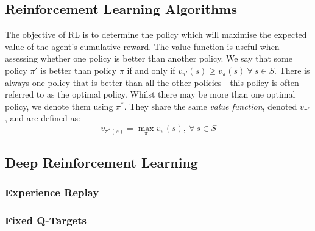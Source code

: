 \documentclass[a4paper]{article}
\begin{document}
\subsection{Reinforcement Learning Algorithms}
The objective of RL is to determine the policy which will maximise the expected value of the agent's cumulative reward. The value function is useful when assessing whether one policy is better than another policy. We say that some policy $\pi'$ is better than policy $\pi$ if and only if $v_{\pi'}(s) \geq v_{\pi}(s) \ \forall \ s \in S$. There is always one policy that is better than all the other policies - this policy is often referred to as the optimal policy. Whilst there may be more than one optimal policy, we denote them using $\pi^*$. They share the same \textit{value function}, denoted $v_{\pi^*}$, and are defined as:
\begin{equation}
v_{\pi^*(s)} = \max_{\pi} v_{\pi}(s), \ \forall \ s \in S
\end{equation}

\subsection{Deep Reinforcement Learning}
\subsubsection{Experience Replay}
\subsubsection{Fixed Q-Targets}

\newpage
\end{document}
